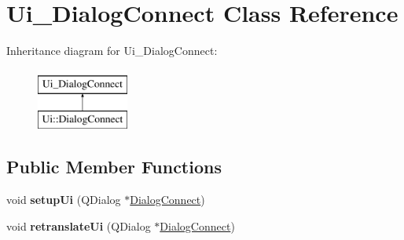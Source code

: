 \hypertarget{classUi__DialogConnect}{\section{Ui\-\_\-\-Dialog\-Connect Class Reference}
\label{classUi__DialogConnect}
}
Inheritance diagram for Ui\-\_\-\-Dialog\-Connect\-:\begin{figure}[H]
\begin{center}
\leavevmode
\includegraphics[height=2.000000cm]{classUi__DialogConnect}
\end{center}
\end{figure}
\subsection*{Public Member Functions}
\begin{DoxyCompactItemize}
\item 
\hypertarget{classUi__DialogConnect_a313569951067ac5b1ceef3b48ed3e6d2}{void {\bfseries setup\-Ui} (Q\-Dialog $\ast$\hyperlink{classDialogConnect}{Dialog\-Connect})}\label{classUi__DialogConnect_a313569951067ac5b1ceef3b48ed3e6d2}

\item 
\hypertarget{classUi__DialogConnect_ac561bc7d6b5a819dd564a1e72e89fd97}{void {\bfseries retranslate\-Ui} (Q\-Dialog $\ast$\hyperlink{classDialogConnect}{Dialog\-Connect})}\label{classUi__DialogConnect_ac561bc7d6b5a819dd564a1e72e89fd97}

\end{DoxyCompactItemize}
